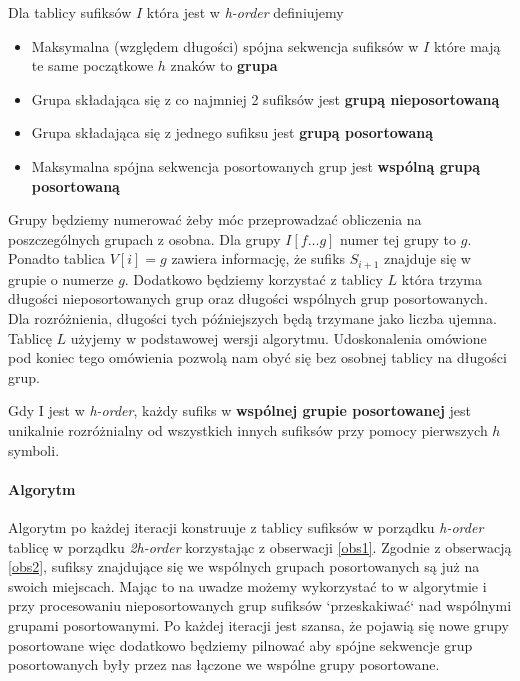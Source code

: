 \begin{definition}{}{}
Dla tablicy sufiksów $I$ która jest w \textit{h-order} definiujemy
\begin{itemize}
    \item Maksymalna (względem długości) spójna sekwencja sufiksów w $I$ które mają te same początkowe $h$ znaków to \textbf{grupa}
    \item Grupa składająca się z co najmniej 2 sufiksów jest \textbf{grupą nieposortowaną}
    \item Grupa składająca się z jednego sufiksu jest \textbf{grupą posortowaną}
    \item Maksymalna spójna sekwencja posortowanych grup jest \textbf{wspólną grupą posortowaną}
\end{itemize}
\end{definition}
Grupy będziemy numerować żeby móc przeprowadzać obliczenia na poszczególnych grupach z osobna. Dla grupy $I[f \ldots g]$ numer tej grupy to $g$. Ponadto tablica $V[i] = g$ zawiera informację, że sufiks $S_{i+1}$ znajduje się w grupie o numerze $g$. Dodatkowo będziemy korzystać z tablicy $L$ która trzyma długości nieposortowanych grup oraz długości wspólnych grup posortowanych. Dla rozróżnienia, długości tych późniejszych będą trzymane jako liczba ujemna. Tablicę $L$ użyjemy w podstawowej wersji algorytmu. Udoskonalenia omówione pod koniec tego omówienia pozwolą nam obyć się bez osobnej tablicy na długości grup.
\begin{lemma}{}{}
\label{obs2}
Gdy I jest w \textit{h-order}, każdy sufiks w \textbf{wspólnej grupie posortowanej} jest unikalnie rozróżnialny od wszystkich innych sufiksów przy pomocy pierwszych $h$ symboli.
\end{lemma}

\paragraph{Algorytm}

Algorytm po każdej iteracji konstruuje z tablicy sufiksów w porządku \textit{h-order} tablicę w porządku \textit{2h-order} korzystając z obserwacji \ref{obs1}. Zgodnie z obserwacją \ref{obs2}, sufiksy znajdujące się we wspólnych grupach posortowanych są już na swoich miejscach. Mając to na uwadze możemy wykorzystać to w algorytmie i przy procesowaniu nieposortowanych grup sufiksów `przeskakiwać` nad wspólnymi grupami posortowanymi. Po każdej iteracji jest szansa, że pojawią się nowe grupy posortowane więc dodatkowo będziemy pilnować aby spójne sekwencje grup posortowanych były przez nas łączone we wspólne grupy posortowane.

